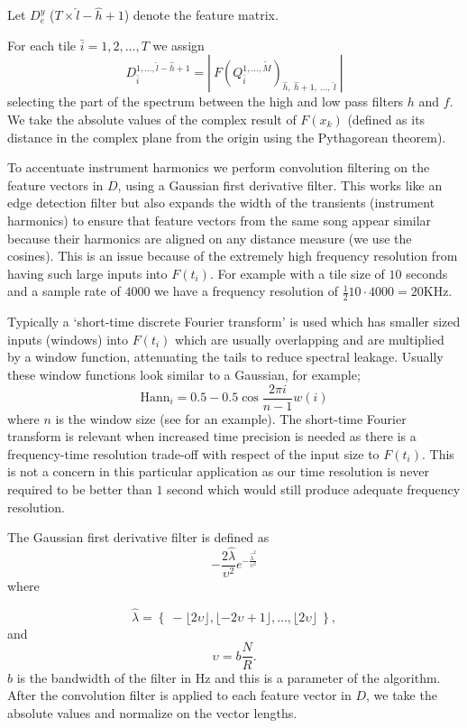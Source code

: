 \documentclass[twocolumn]{article}
\begin{document}
	Let $D_e^y$ ($T \times \hat{l}-\hat{h}+1$) denote the feature matrix.
	
	For each tile $\bar{i}=1,2,\ldots,T$ we assign 
\[
D_{\bar{i}}^{1,\ldots,\hat{l}-\hat{h}+1} = \left|~F(Q_{\bar{i}}^{1,\ldots,\tilde{M}})_{\hat{h},~\hat{h}+1,~\ldots,~\hat{l} }~\right|
\]
 selecting the part of the spectrum between the high and low pass filters $h$ and $f$.  We take the absolute values of the complex result of $F(x_k)$ (defined as its distance in the complex plane from the origin using the Pythagorean theorem).
	
	To accentuate instrument harmonics we perform convolution filtering on the feature vectors in $D$, using a Gaussian first derivative filter. This works like an edge detection filter but also expands the width of the transients (instrument harmonics) to ensure that feature vectors from the same song appear similar because their harmonics are aligned on any distance measure (we use the cosines). This is an issue because of the extremely high frequency resolution from having such large inputs into $F(t_i)$. For example with a tile size of $10$ seconds and a sample rate of $4000$ we have a frequency resolution of $\frac{1}{2}10 \cdot 4000 = 20$KHz. 
	
	Typically a `short-time discrete Fourier transform' is used which has smaller sized inputs (windows) into $F(t_i)$ which are usually overlapping and are multiplied by a window function, attenuating the tails to reduce spectral leakage. Usually these window functions look similar to a Gaussian, for example;  
	\[
	\mathrm{Hann}_i = 0.5 - 0.5 \cos\frac{2\pi i}{n-1}{w(i)}
	\] where $n$ is the window size
	(see \cite{tzanetakis1999multifeature} for an example). The short-time Fourier transform is relevant when increased time precision is needed as there is a frequency-time resolution trade-off with respect of the input size to $F(t_i)$. This is not a concern in this particular application as our time resolution is never required to be better than $1$ second which would still produce adequate frequency resolution.
	
	The Gaussian first derivative filter is defined as 
	$$- \frac{2 \hat{\lambda}}{\upsilon^2}  e^{-\frac{\hat{\lambda}^2}{\upsilon^2}} $$ where 
	
	$$\hat{\lambda}=\left\{~-\lfloor 2\upsilon\rfloor,\lfloor-2\upsilon+1\rfloor,\ldots, \lfloor 2 \upsilon \rfloor~\right\},$$ and $$\upsilon = b  \frac{N}{R} .$$ $b$ is the bandwidth of the filter in Hz and this is a parameter of the algorithm. After the convolution filter is applied to each feature vector in $D$, we take the absolute values and normalize on the vector lengths.  
	
\end{document}
